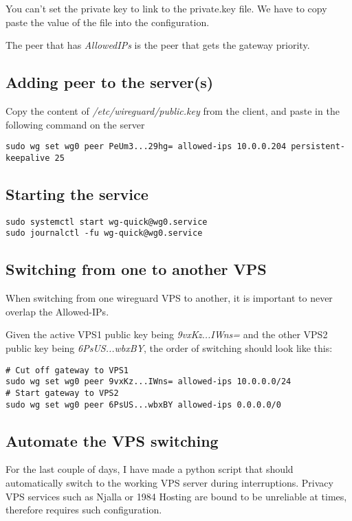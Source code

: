 \documentclass[letterpaper, 11pt]{article}
\begin{document}
You can't set the private key to link to the private.key file. We have to copy paste the value of the file into the configuration.

The peer that has \textit{AllowedIPs} is the peer that gets the gateway priority.

\subsection{Adding peer to the server(s)}
\label{sec:org859c234}
Copy the content of \textit{/etc/wireguard/public.key} from the client, and paste in the following command on the server

\begin{verbatim}
sudo wg set wg0 peer PeUm3...29hg= allowed-ips 10.0.0.204 persistent-keepalive 25
\end{verbatim}

\subsection{Starting the service}
\label{sec:org057f1ac}
\begin{verbatim}
sudo systemctl start wg-quick@wg0.service
sudo journalctl -fu wg-quick@wg0.service
\end{verbatim}

\subsection{Switching from one to another VPS}
\label{sec:org85025e2}
When switching from one wireguard VPS to another, it is important to never overlap the Allowed-IPs.

Given the active VPS1 public key being \textit{9vxKz...IWns=} and the other VPS2 public key being \textit{6PsUS...wbxBY}, the order of switching should look like this:

\begin{verbatim}
# Cut off gateway to VPS1
sudo wg set wg0 peer 9vxKz...IWns= allowed-ips 10.0.0.0/24
# Start gateway to VPS2
sudo wg set wg0 peer 6PsUS...wbxBY allowed-ips 0.0.0.0/0
\end{verbatim}

\subsection{Automate the VPS switching}
\label{sec:org56e17ce}
For the last couple of days, I have made a python script that should automatically switch to the working VPS server during interruptions.
Privacy VPS services such as Njalla or 1984 Hosting are bound to be unreliable at times, therefore requires such configuration.
\end{document}
